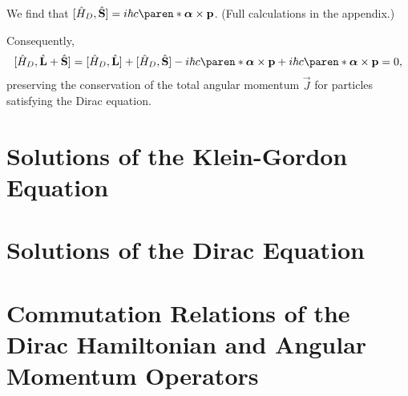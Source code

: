 \documentclass[11pt]{penrose}
\begin{document}
We find that $\comm{\qop{H}_D, \qop{\vec{S}}} = i\hbar c \paren*{\vec{\alpha} \times \vec{p}}$. (Full calculations in the appendix.)

Consequently,
\begin{equation}
    \comm{\qop{H}_D, \qop{\vec{L}} + \qop{\vec{S}}}
    = \comm{\qop{H}_D, \qop{\vec{L}}} + \comm{\qop{H}_D, \qop{\vec{S}}}
    - i\hbar c \paren*{\vec{\alpha} \times \vec{p}} + i\hbar c \paren*{\vec{\alpha} \times \vec{p}}
    = 0,
\end{equation}
preserving the conservation of the total angular momentum $\vec{J}$ for particles satisfying the Dirac equation.

\section{Solutions of the Klein-Gordon Equation}

\section{Solutions of the Dirac Equation}

\appendix
\section{Commutation Relations of the Dirac Hamiltonian and Angular Momentum Operators}
\end{document}
